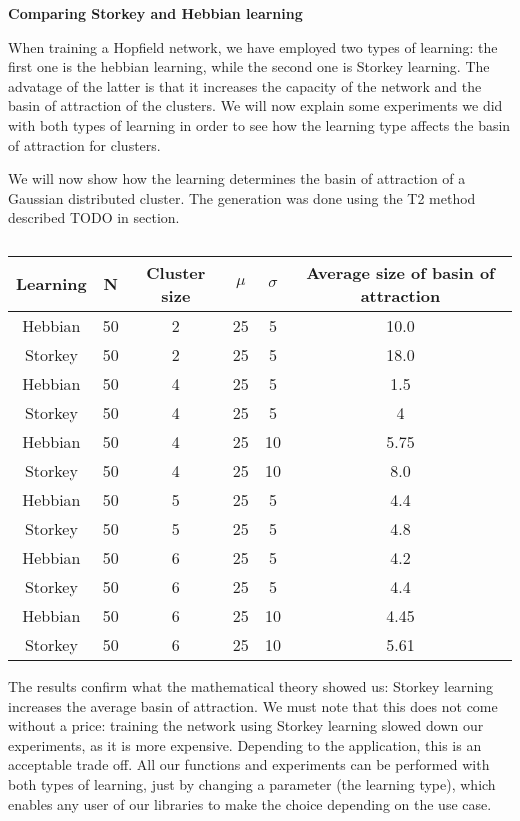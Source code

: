 \documentclass{letter}
\newcommand{\tmtextbf}[1]{{\bfseries{#1}}}
\begin{document}
\tmtextbf{Comparing Storkey and Hebbian learning}

When training a Hopfield network, we have employed two types of learning: the
first one is the hebbian learning, while the second one is Storkey learning.
The advatage of the latter is that it increases the capacity of the network
and the basin of attraction of the clusters. We will now explain some
experiments we did with both types of learning in order to see how the
learning type affects the basin of attraction for clusters.

We will now show how the learning determines the basin of attraction of a
Gaussian distributed cluster. The generation was done using the T2 method
described TODO in section.

\begin{table}[h]
  \begin{tabular}{|c|c|c|c|c|c|}
    \hline
    \tmtextbf{Learning} & N & Cluster size & $\mu$ & $\sigma$ & Average size
    of basin of attraction\\
    \hline
    Hebbian & 50 & 2 & 25 & 5 & 10.0\\
    \hline
    Storkey & 50 & 2 & 25 & 5 & 18.0\\
    \hline
    Hebbian & 50 & 4 & 25 & 5 & 1.5\\
    \hline
    Storkey & 50 & 4 & 25 & 5 & 4\\
    \hline
    Hebbian & 50 & 4 & 25 & 10 & 5.75\\
    \hline
    Storkey & 50 & 4 & 25 & 10 & 8.0\\
    \hline
    Hebbian & 50 & 5 & 25 & 5 & 4.4\\
    \hline
    Storkey & 50 & 5 & 25 & 5 & 4.8\\
    \hline
    Hebbian & 50 & 6 & 25 & 5 & 4.2\\
    \hline
    Storkey & 50 & 6 & 25 & 5 & 4.4\\
    \hline
    Hebbian & 50 & 6 & 25 & 10 & 4.45\\
    \hline
    Storkey & 50 & 6 & 25 & 10 & 5.61\\
    \hline
  \end{tabular}
  \caption{}
\end{table}



The results confirm what the mathematical theory showed us: Storkey learning
increases the average basin of attraction. We must note that this does not
come without a price: training the network using Storkey learning slowed down
our experiments, as it is more expensive. Depending to the application, this
is an acceptable trade off. All our functions and experiments can be performed
with both types of learning, just by changing a parameter (the learning type),
which enables any user of our libraries to make the choice depending on the
use case.
\end{document}
